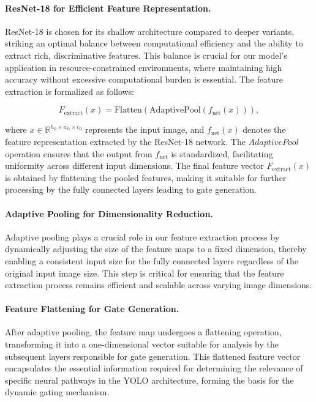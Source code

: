 \paragraph{ResNet-18 for Efficient Feature Representation.} ResNet-18 is chosen for its shallow architecture compared to deeper variants, striking an optimal balance between computational efficiency and the ability to extract rich, discriminative features. This balance is crucial for our model's application in resource-constrained environments, where maintaining high accuracy without excessive computational burden is essential. The feature extraction is formalized as follows:

\begin{equation}
    F_{\text{extract}}(x) = \text{Flatten}(\text{AdaptivePool}(f_{\text{net}}(x))),
    \label{eq:feature_flatten}
\end{equation}

where \(x \in \mathbb{R}^{h_0 \times w_0 \times c_0}\) represents the input image, and \(f_{\text{net}}(x)\) denotes the feature representation extracted by the ResNet-18 network. The \(AdaptivePool\) operation ensures that the output from \(f_{\text{net}}\) is standardized, facilitating uniformity across different input dimensions. The final feature vector \(F_{\text{extract}}(x)\) is obtained by flattening the pooled features, making it suitable for further processing by the fully connected layers leading to gate generation.

\paragraph{Adaptive Pooling for Dimensionality Reduction.} Adaptive pooling plays a crucial role in our feature extraction process by dynamically adjusting the size of the feature maps to a fixed dimension, thereby enabling a consistent input size for the fully connected layers regardless of the original input image size. This step is critical for ensuring that the feature extraction process remains efficient and scalable across varying image dimensions.

\paragraph{Feature Flattening for Gate Generation.} After adaptive pooling, the feature map undergoes a flattening operation, transforming it into a one-dimensional vector suitable for analysis by the subsequent layers responsible for gate generation. This flattened feature vector encapsulates the essential information required for determining the relevance of specific neural pathways in the YOLO architecture, forming the basis for the dynamic gating mechanism.

